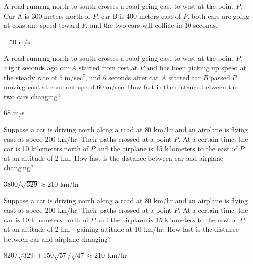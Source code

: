 \begin{exercises}
\begin{exercise}
A road running north to south crosses a road going east to west at the
point $P$. Car A is 300 meters north of $P$, car B is 400 meters east
of $P$, both cars are going at constant speed toward $P$, and the two
cars will collide in 10 seconds.
\begin{answer} $-50$ m/s
\end{answer}\end{exercise}

\begin{exercise}
A road running north to south crosses a road going east to west at the
point $P$. Eight seconds ago car $A$ started from rest at $P$ and has
been picking up speed at the steady rate of $5$ m/sec${}^2$, and $6$
seconds after car $A$ started car $B$ passed $P$ moving east at
constant speed 60 m/sec. How fast is the distance between the two cars
changing?
\begin{answer} $68$ m/s
\end{answer}\end{exercise}

\begin{exercise} 
Suppose a car is driving north along a road at $80$ km/hr and an
airplane is flying east at speed $200$ km/hr. Their paths crossed at a
point $P$. At a certain time, the car is 10 kilometers north of $P$
and the airplane is 15 kilometers to the east of $P$ at an altitude of
2 km. How fast is the distance between car and airplane changing?
\begin{answer} $3800/\sqrt{329}\approx 210$ km/hr 
\end{answer}\end{exercise}




\begin{exercise} 
Suppose a car is driving north along a road at $80$ km/hr and an
airplane is flying east at speed $200$ km/hr. Their paths crossed at a
point $P$. At a certain time, the car is 10 kilometers north of $P$
and the airplane is 15 kilometers to the east of $P$ at an altitude of
2 km---gaining altitude at 10 km/hr. How fast is the distance between
car and airplane changing?
\begin{answer} \hbox{$820/\sqrt{329}+150\sqrt{57}/\sqrt{47}\approx 210$ km/hr}
\end{answer}\end{exercise}


\end{exercises}

